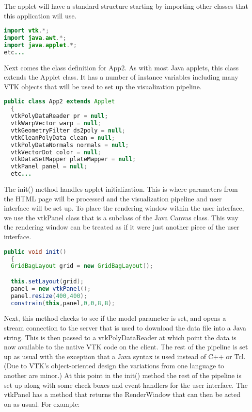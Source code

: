 The applet will have a standard structure starting by importing other classes that this application will use.

\begin{lstlisting}[language=Java, caption={}, numbers=none, frame=none]
import vtk.*;
import java.awt.*;
import java.applet.*;
etc...
\end{lstlisting}

Next comes the class definition for App2. As with most Java applets, this class extends the Applet class. It has a number of instance variables including many VTK objects that will be used to set up the visualization pipeline.

\begin{lstlisting}[language=Java, caption={}, numbers=none, frame=none]
public class App2 extends Applet
  {
  vtkPolyDataReader pr = null;
  vtkWarpVector warp = null;
  vtkGeometryFilter ds2poly = null;
  vtkCleanPolyData clean = null;
  vtkPolyDataNormals normals = null;
  vtkVectorDot color = null;
  vtkDataSetMapper plateMapper = null;
  vtkPanel panel = null;
  etc...
\end{lstlisting}

The init() method handles applet initialization. This is where parameters from the HTML page will be processed and the visualization pipeline and user interface will be set up. To place the rendering window within the user interface, we use the vtkPanel class that is a subclass of the Java Canvas class. This way the rendering window can be treated as if it were just another piece of the user interface.

\begin{lstlisting}[language=Java, caption={}, numbers=none, frame=none]
public void init()
  {
  GridBagLayout grid = new GridBagLayout();

  this.setLayout(grid);
  panel = new vtkPanel();
  panel.resize(400,400);
  constrain(this,panel,0,0,8,8);
\end{lstlisting}

Next, this method checks to see if the model parameter is set, and opens a stream connection to the server that is used to download the data file into a Java string. This is then passed to a vtkPolyDataReader at which point the data is now available to the native VTK code on the client. The rest of the pipeline is set up as usual with the exception that a Java syntax is used instead of C++ or Tcl. (Due to VTK’s object-oriented design the variations from one language to another are minor.) At this point in the init() method the rest of the pipeline is set up along with some check boxes and event handlers for the user interface. The vtkPanel has a method that returns the RenderWindow that can then be acted on as usual. For example:

